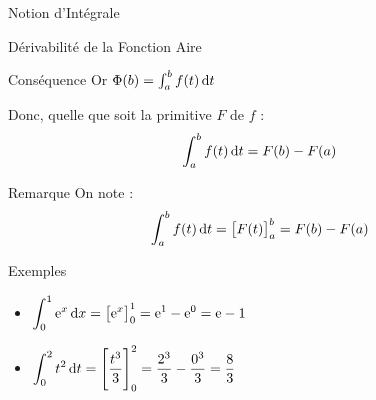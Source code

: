 \documentclass{coursbook}
\begin{document}
\begin{Gpartie}{Notion d'Intégrale}
\begin{Spartie}{Dérivabilité de la Fonction Aire}
\begin{SSpartie}{Conséquence}
                Or $\Phi(b)=\int_a^b f(t)\,\mathrm{d}t$
                
                Donc, quelle que soit la primitive $F$ de $f$ : \[\int_a^b f(t)\,\mathrm{d}t=F(b)-F(a)\]
            \end{SSpartie}
            \begin{SSpartie}{Remarque} 
                On note : \[\int_a^b f(t)\,\mathrm{d}t=\big[F(t)\big]_a^b=F(b)-F(a)\]
            \end{SSpartie}
            \begin{SSpartie}{Exemples} 
                \begin{itemize}
                    \item $\displaystyle \int_0^1\mathrm{e}^x\,\mathrm{d}x=\big[\mathrm{e}^x\big]_0^1=\mathrm{e}^1-\mathrm{e}^0=\mathrm{e}-1$
                    \item $\displaystyle \int_0^2t^2\dt=\Bigg[\frac{t^3}{3}\Bigg]_0^2=\frac{2^3}{3}-\frac{0^3}{3}=\frac{8}{3}$
                \end{itemize}
            \end{SSpartie}
        \end{Spartie}
    \end{Gpartie}
\end{document}
